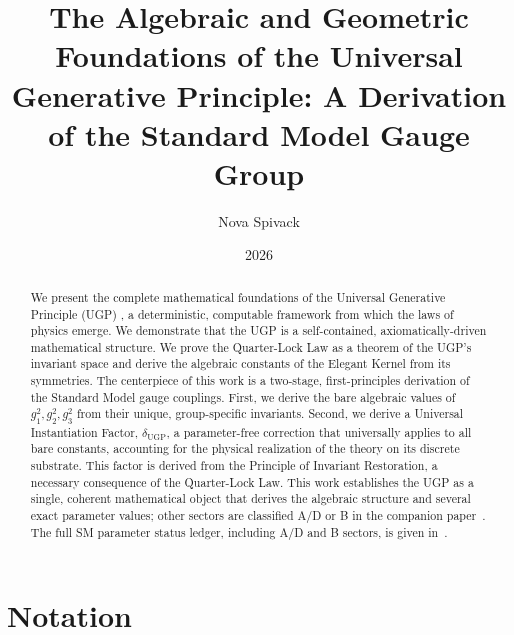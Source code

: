 \documentclass[11pt,twocolumn]{article}
\title{\vspace{-0.6em}\bf The Algebraic and Geometric Foundations of the Universal Generative Principle: A Derivation of the Standard Model Gauge Group}
\author[1]{Nova Spivack}
\date{2026}
\begin{document}
\maketitle
\NovaZenodoAfterTitle

\begin{abstract}
We present the complete mathematical foundations of the Universal Generative Principle (UGP) \cite{SpivackUGPFormalization,ugp-lean}, a deterministic, computable framework from which the laws of physics emerge. We demonstrate that the UGP is a self-contained, axiomatically-driven mathematical structure. We prove the Quarter-Lock Law as a theorem of the UGP's invariant space and derive the algebraic constants of the Elegant Kernel from its symmetries. The centerpiece of this work is a two-stage, first-principles derivation of the Standard Model gauge couplings. First, we derive the bare algebraic values of $g_1^2, g_2^2, g_3^2$ from their unique, group-specific invariants. Second, we derive a Universal Instantiation Factor, $\delta_{\text{UGP}}$, a parameter-free correction that universally applies to all bare constants, accounting for the physical realization of the theory on its discrete substrate. This factor is derived from the Principle of Invariant Restoration, a necessary consequence of the Quarter-Lock Law. This work establishes the UGP as a single, coherent mathematical object that derives the algebraic structure and several exact parameter values; other sectors are classified A/D or B in the companion paper~\cite{Spivack2026_SM_UGP}. The full SM parameter status ledger, including A/D and B sectors, is given in~\cite{Spivack2026_SM_UGP}.
\end{abstract}

\tableofcontents
\newpage

\section*{Notation}
\end{document}
